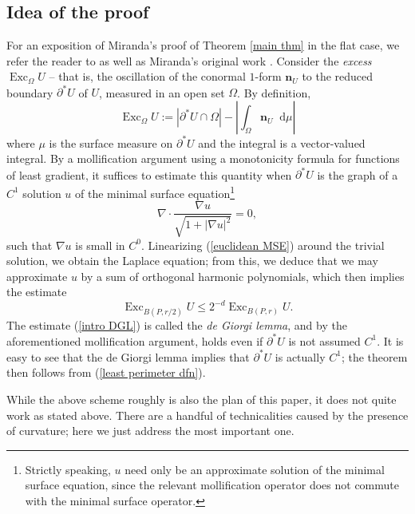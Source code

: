 \documentclass[reqno,11pt]{amsart}
\DeclareMathOperator{\Exc}{Exc}
\newcommand*\dif{\mathop{}\!\mathrm{d}}
\newcommand{\normal}{\mathbf n}
\newcommand{\dfn}[1]{\emph{#1}\index{#1}}
\theoremstyle{definition}
\numberwithin{equation}{section}
\begin{document}
\subsection{Idea of the proof}
For an exposition of Miranda's proof of Theorem \ref{main thm} in the flat case, we refer the reader to \cite[Chapters 5-9]{Giusti77} as well as Miranda's original work \cite{Miranda66}.
Consider the \dfn{excess} $\Exc_\Omega U$ -- that is, the oscillation of the conormal $1$-form $\normal_U$ to the reduced boundary $\partial^* U$ of $U$, measured in an open set $\Omega$.
By definition,
\begin{equation}\label{intro excess}
\Exc_\Omega U := |\partial^* U \cap \Omega| - \left|\int_\Omega \normal_U \dif \mu\right|
\end{equation}
where $\mu$ is the surface measure on $\partial^* U$ and the integral is a vector-valued integral.
By a mollification argument using a monotonicity formula for functions of least gradient, it suffices to estimate this quantity when $\partial^* U$ is the graph of a $C^1$ solution $u$ of the minimal surface equation\footnote{Strictly speaking, $u$ need only be an approximate solution of the minimal surface equation, since the relevant mollification operator does not commute with the minimal surface operator.}
\begin{equation}\label{euclidean MSE}
\nabla \cdot \frac{\nabla u}{\sqrt{1 + |\nabla u|^2}} = 0,
\end{equation}
such that $\nabla u$ is small in $C^0$. 
Linearizing (\ref{euclidean MSE}) around the trivial solution, we obtain the Laplace equation; from this, we deduce that we may approximate $u$ by a sum of orthogonal harmonic polynomials, which then implies the estimate 
\begin{equation}\label{intro DGL}
\Exc_{B(P, r/2)} U \leq 2^{-d} \Exc_{B(P, r)} U.
\end{equation}
The estimate (\ref{intro DGL}) is called the \dfn{de Giorgi lemma}, and by the aforementioned mollification argument, holds even if $\partial^* U$ is not assumed $C^1$.
It is easy to see that the de Giorgi lemma implies that $\partial^* U$ is actually $C^1$; the theorem then follows from (\ref{least perimeter dfn}).

While the above scheme roughly is also the plan of this paper, it does not quite work as stated above.
There are a handful of technicalities caused by the presence of curvature; here we just address the most important one.
\end{document}
